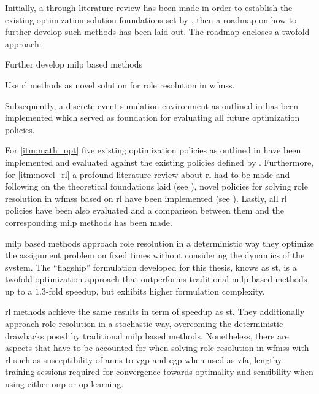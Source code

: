 Initially, a through literature review has been made in order to establish the existing optimization solution \ie foundations set by \citet{Zeng2005}, then a roadmap on how to further develop such methods has been laid out. The roadmap encloses a twofold approach:
\begin{enumerate*}[ref=Approach \Roman*]
 	\item Further develop \gls{milp} based methods \label{itm:math_opt}
 	\item Use \gls{rl} methods as novel solution for role resolution in \glspl{wfms}. \label{itm:novel_rl}
 \end{enumerate*} 

Subsequently, a discrete event simulation environment as outlined in  has been implemented which served as foundation for evaluating all future optimization policies.

For \ref{itm:math_opt} five existing optimization policies as outlined in  have been implemented and evaluated against the existing policies defined by \citet[pp. 13--14]{Zeng2005}. Furthermore, for \ref{itm:novel_rl} a profound literature review about \gls{rl} had to be made and following on the theoretical foundations laid (see ), novel policies for solving role resolution in \glspl{wfms} based on \gls{rl} have been implemented (see ). Lastly, all \gls{rl} policies have been also evaluated and a comparison between them and the corresponding \gls{milp} methods has been made.

\gls{milp} based methods approach role resolution in a deterministic way \ie they optimize the assignment problem on fixed times without considering the dynamics of the system. The ``flagship'' formulation developed for this thesis, knows as \gls{st}, is a twofold optimization approach that outperforms traditional \gls{milp} based methods up to a $1.3$-fold speedup, but exhibits higher formulation complexity. 

\gls{rl} methods achieve the same results in term of speedup as \gls{st}. They additionally approach role resolution in a stochastic way, overcoming the deterministic drawbacks posed by traditional \gls{milp} based methods. Nonetheless, there are aspects that have to be accounted for when solving role resolution in \glspl{wfms} with \gls{rl} such as susceptibility of \glspl{ann} to \gls{vgp} and \gls{egp} when used as \gls{vfa}, lengthy training sessions required for convergence towards optimality and sensibility when using either \gls{onp} or \gls{op} learning.

